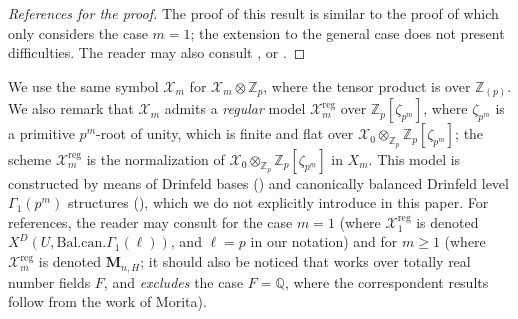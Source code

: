 \documentclass[a4paper,11pt]{amsart}
\numberwithin{equation}{section}
\theoremstyle{plain}
\theoremstyle{definition}
\theoremstyle{remark}
\newcommand{\Q}{\mathbb{Q}}
\newcommand{\Z}{\mathbb{Z}}
\newcommand{\reg}{\mathrm{reg}}
\begin{document}
\begin{proof}[References for the proof]
The proof of this result is similar to the proof of \cite[Proposition 4.1]{Buz} which only considers the case $m=1$; the extension to the general case does not present difficulties. The reader may also consult \cite[Theorem 81]{Clark}, \cite[\S1.1]{Mori1} or \cite[\S7.3]{Carayol-Shimura}.  
\end{proof}

We use the same symbol $\mathcal{X}_m$ for $\mathcal{X}_m\otimes\Z_p$, where the tensor product is over $\Z_{(p)}$. We also remark that $\mathcal{X}_m$ admits a \emph{regular} model ${\mathcal{X}}^\mathrm{reg}_m$ over $\Z_p[\zeta_{p^m}]$, where $\zeta_{p^m}$ is a primitive $p^m$-root of unity, which is finite and flat over $\mathcal{X}_0\otimes_{\Z_p}\Z_p[\zeta_{p^m}]$; the scheme $\mathcal{X}_m^\reg$ is the normalization of 
$\mathcal{X}_0\otimes_{\Z_p}\Z_p[\zeta_{p^m}]$ in $X_m$. 
This model is constructed by means of Drinfeld bases (\cite[\S7.2]{Carayol-Shimura}) 
and canonically balanced Drinfeld level $\Gamma_1(p^m)$ structures (\cite[Definition 3.4]{Buz}), which we do not explicitly introduce in this paper. 
For references, the reader may consult \cite[Theorem 4.10]{Buz} for the case $m=1$ (where $\mathcal{X}_1^\reg$ is denoted 
$X^D(U,\mathrm{Bal.can.}\Gamma_1(\ell))$, and $\ell=p$ in our notation)
and \cite[\S7.3]{Carayol-Shimura} for $m\geq 1$ (where $\mathcal{X}_m^\reg$ is denoted $\boldsymbol{M}_{n,H}$; it should also be noticed that \cite{Carayol-Shimura} works over totally real number fields $F$, and \emph{excludes} the 
case $F=\Q$, where the correspondent results follow from the work of Morita).
\end{document}
